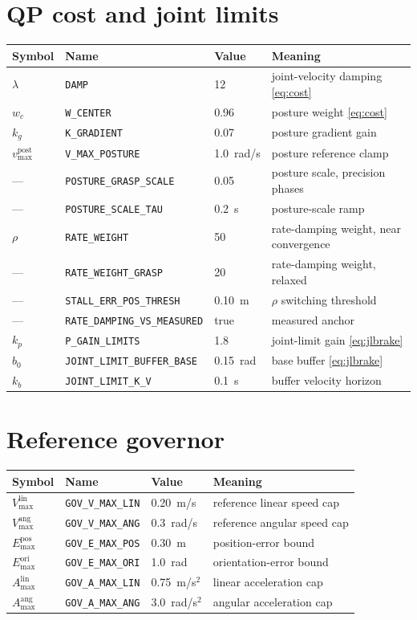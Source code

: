 \documentclass[12pt,a4paper,twoside,openright]{report}
\begin{document}
\section{QP cost and joint limits}
\begin{tabularx}{\linewidth}{@{}lllX@{}}
\toprule
Symbol & Name & Value & Meaning \\
\midrule
$\lambda$ & \texttt{DAMP} & 12 & joint-velocity damping \eqref{eq:cost} \\
$w_c$ & \texttt{W\_CENTER} & 0.96 & posture weight \eqref{eq:cost} \\
$k_g$ & \texttt{K\_GRADIENT} & 0.07 & posture gradient gain \\
$v_{\max}^{\text{post}}$ & \texttt{V\_MAX\_POSTURE} & 1.0~rad/s & posture reference clamp \\
--- & \texttt{POSTURE\_GRASP\_SCALE} & 0.05 & posture scale, precision phases \\
--- & \texttt{POSTURE\_SCALE\_TAU} & 0.2~s & posture-scale ramp \\
$\rho$ & \texttt{RATE\_WEIGHT} & 50 & rate-damping weight, near convergence \\
--- & \texttt{RATE\_WEIGHT\_GRASP} & 20 & rate-damping weight, relaxed \\
--- & \texttt{STALL\_ERR\_POS\_THRESH} & 0.10~m & $\rho$ switching threshold \\
--- & \texttt{RATE\_DAMPING\_VS\_MEASURED} & true & measured anchor \\
$k_p$ & \texttt{P\_GAIN\_LIMITS} & 1.8 & joint-limit gain \eqref{eq:jlbrake} \\
$b_0$ & \texttt{JOINT\_LIMIT\_BUFFER\_BASE} & 0.15~rad & base buffer \eqref{eq:jlbrake} \\
$k_b$ & \texttt{JOINT\_LIMIT\_K\_V} & 0.1~s & buffer velocity horizon \\
\bottomrule
\end{tabularx}

\section{Reference governor}
\begin{tabularx}{\linewidth}{@{}lllX@{}}
\toprule
Symbol & Name & Value & Meaning \\
\midrule
$V_{\max}^{\text{lin}}$ & \texttt{GOV\_V\_MAX\_LIN} & 0.20~m/s & reference linear speed cap \\
$V_{\max}^{\text{ang}}$ & \texttt{GOV\_V\_MAX\_ANG} & 0.3~rad/s & reference angular speed cap \\
$E_{\max}^{\text{pos}}$ & \texttt{GOV\_E\_MAX\_POS} & 0.30~m & position-error bound \\
$E_{\max}^{\text{ori}}$ & \texttt{GOV\_E\_MAX\_ORI} & 1.0~rad & orientation-error bound \\
$A_{\max}^{\text{lin}}$ & \texttt{GOV\_A\_MAX\_LIN} & 0.75~m/s$^2$ & linear acceleration cap \\
$A_{\max}^{\text{ang}}$ & \texttt{GOV\_A\_MAX\_ANG} & 3.0~rad/s$^2$ & angular acceleration cap \\
\bottomrule
\end{tabularx}
\end{document}

